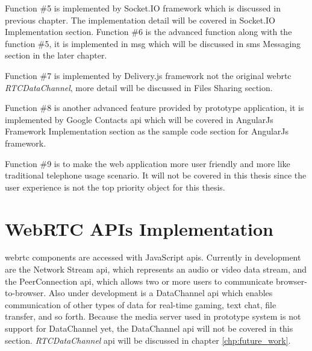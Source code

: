 \par Function \#5 is implemented by Socket.IO framework which is discussed in previous chapter. The implementation detail will be covered in Socket.IO Implementation section.
Function \#6 is the advanced function along with the function \#5, it is implemented in \gls{msg} which will be discussed in \gls{sms} Messaging section in the later chapter.

\par Function \#7 is implemented by Delivery.js framework not the original \gls{webrtc} \textit{RTCDataChannel}, more detail will be discussed in Files Sharing section.

\par Function \#8 is another advanced feature provided by prototype application, it is implemented by Google Contacts \gls{api} which will be covered in AngularJs Framework Implementation section as the sample code section for AngularJs framework.

\par Function \#9 is to make the web application more user friendly and more like traditional telephone usage scenario. It will not be covered in this thesis since the user experience is not the top priority object for this thesis.

\section{WebRTC APIs Implementation}

\noindent \gls{webrtc} components are accessed with JavaScript \gls{api}s. Currently in development are the Network Stream \gls{api}, which represents an audio or video data stream, and the PeerConnection \gls{api}, which allows two or more users to communicate browser-to-browser. Also under development is a DataChannel \gls{api} which enables communication of other types of data for real-time gaming, text chat, file transfer, and so forth. Because the media server used in prototype system is not support for DataChannel yet, the DataChannel \gls{api} will not be covered in this section. \textit{RTCDataChannel} \gls{api} will be discussed in chapter \ref{chp:future_work}.

